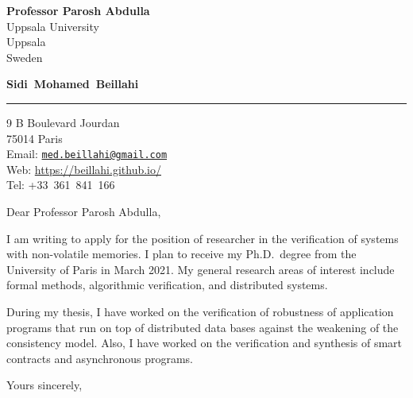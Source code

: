 \documentclass[a4paper, 11pt]{letter}
\date{\today} %
\makeatletter
\newcommand{\covertitle}{Sidi~Mohamed~Beillahi}                  %
\newcommand{\authoraddress}{                            %
    9 B Boulevard Jourdan \\
    75014 Paris }
\newcommand{\authorweb}{https://beillahi.github.io/}           %
\newcommand{\authoremail}{med.beillahi@gmail.com}          %
\newcommand{\authortel}{+33~361~841~166}                %
\makeatother
\begin{document}
\signature{Sidi Mohamed Beillahi}        %

\longindentation=0pt            %
\let\raggedleft\raggedright     %

\renewcommand{\labelitemi}{$\vcenter{\hbox{\tiny$\bullet$}}$}


\newcommand{\makecovertitle}{
    \begin{center}
    {\Large\bf \covertitle}
    \end{center}
    \smallskip\hrule height 1pt
}

\newcommand{\contact}{
    \begin{center}
    \authoraddress \\
    Email: \href{mailto:\authoremail}{\texttt{\authoremail}} \\
    Web: \url{\authorweb}\\
    Tel: \authortel
    \end{center}
}


\begin{letter}
{   %
\textbf{Professor Parosh Abdulla} \\
Uppsala University \\
Uppsala \\
Sweden
}

\makecovertitle

\contact

\opening{Dear Professor Parosh Abdulla,}

I am writing to apply for the position of researcher in the verification of systems with non-volatile memories.  
I plan to receive my Ph.D.\ degree from the University of Paris in March 2021. My general research areas of interest
include formal methods, algorithmic verification, and distributed systems.

During my thesis, I have worked on the verification of robustness of application programs that run on top of distributed data bases against the weakening of the consistency model. Also, I have worked on the verification and synthesis of smart contracts and asynchronous programs. 


\closing{Yours sincerely,}


\end{letter}
\end{document}
